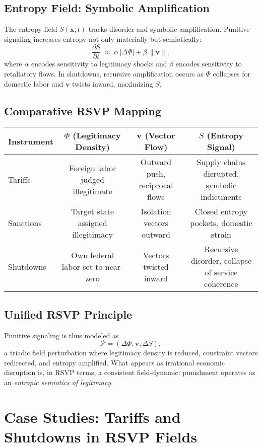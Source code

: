 \documentclass{article}
\begin{document}
\subsection{Entropy Field: Symbolic Amplification}
The entropy field $S(\mathbf{x},t)$ tracks disorder and symbolic amplification. 
Punitive signaling increases entropy not only materially but semiotically:
\[
\frac{\partial S}{\partial t} \;\approx\; \alpha \, \lvert \Delta \Phi \rvert 
+ \beta \, \lVert \mathbf{v} \rVert ,
\]
where $\alpha$ encodes sensitivity to legitimacy shocks and $\beta$ encodes sensitivity 
to retaliatory flows. In shutdowns, recursive amplification occurs as $\Phi$ collapses 
for domestic labor and $\mathbf{v}$ twists inward, maximizing $S$. 

\subsection{Comparative RSVP Mapping}
\begin{center}
\begin{tabular}{|l|c|c|c|}
\hline
\textbf{Instrument} & $\Phi$ (Legitimacy Density) & $\mathbf{v}$ (Vector Flow) 
& $S$ (Entropy Signal) \\
\hline
Tariffs & Foreign labor judged illegitimate 
& Outward push, reciprocal flows 
& Supply chains disrupted, symbolic indictments \\
\hline
Sanctions & Target state assigned illegitimacy 
& Isolation vectors outward 
& Closed entropy pockets, domestic strain \\
\hline
Shutdowns & Own federal labor set to near-zero 
& Vectors twisted inward 
& Recursive disorder, collapse of service coherence \\
\hline
\end{tabular}
\end{center}

\subsection{Unified RSVP Principle}
Punitive signaling is thus modeled as 
\[
\mathcal{P} = \left(\Delta \Phi, \mathbf{v}, \Delta S \right) ,
\]
a triadic field perturbation where legitimacy density is reduced, constraint vectors 
redirected, and entropy amplified. What appears as irrational economic disruption 
is, in RSVP terms, a consistent field-dynamic: punishment operates as an 
\emph{entropic semiotics of legitimacy}.

\section{Case Studies: Tariffs and Shutdowns in RSVP Fields}
\label{sec:tariffs-shutdowns}
\end{document}
